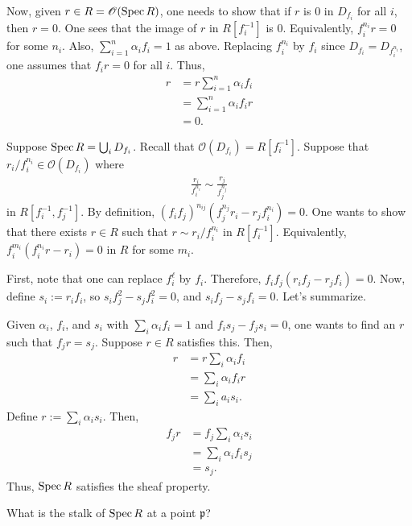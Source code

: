 \documentclass [11 pt, oneside, margin = 1 in] {article}
\begin{document}
Now, given $r\in R = \mathscr{O}(\operatorname{Spec} R)$, one needs to show that if $r$ is $0$ in $D_{f_i}$ for all $i$, then $r=0$. One sees that the image of $r$ in $R[f_i^{-1}]$ is $0$. Equivalently, $f_i^{n_i} r = 0$ for some $n_i$. Also, $\sum_{i=1}^{n} \alpha_if_i=1$ as above. Replacing $f_i^{n_i}$ by $f_i$ since $D_{f_i}=D_{f_i^{n_i}}$, one assumes that $f_ir = 0$ for all $i$. Thus,
\begin{align*}
	r &= r \sum_{i=1}^{n} \alpha_if_i\\
	  &= \sum_{i=1}^{n} \alpha_i f_ir\\
	  &= 0.
\end{align*}

Suppose $\operatorname{Spec} R = \bigcup_i D_{f_i}$.
Recall that $\mathscr{O}(D_{f_i})=R[f_i^{-1}]$. Suppose that $r_i/f_i^{n_i}\in \mathscr{O}(D_{f_i})$ where
\begin{align*}
	\frac{r_i}{f_i^{n_i}} \sim \frac{r_j}{f_j^{n_j}}
\end{align*}
in $R[f_i^{-1},f_j^{-1}]$. By definition, $(f_if_j)^{n_{ij}}(f_j^{n_j}r_i - r_j f_i^{n_i})=0$. One wants to show that there exists $r\in R$ such that $r\sim r_i/f_i^{n_i}$ in $R[f_i^{-1}]$. Equivalently, $f_i^{m_i}(f_i^{n_i} r - r_i)=0$ in $R$ for some $m_i$.

First, note that one can replace $f_i^{\ell}$ by $f_i$. Therefore, $f_if_j(r_if_j - r_jf_i)=0$. Now, define $s_i := r_if_i$, so $s_i f_j^2 - s_jf_i^2=0$, and $s_if_j - s_j f_i =0$. Let's summarize.

Given $\alpha_i$, $f_i$, and $s_i$ with $\sum_{i}^{} \alpha_if_i=1$ and $f_is_j - f_js_i=0$, one wants to find an $r$ such that $f_jr = s_j$. Suppose $r\in R$ satisfies this. Then,
\begin{align*}
	r &= r \sum_{i}^{} \alpha_if_i\\
	  &= \sum_{i}^{} \alpha_i f_ir\\
	  &= \sum_{i}^{} a_is_i.
\end{align*}
Define $r:= \sum_{i}^{} \alpha_is_i$. Then,
\begin{align*}
	f_j r &= f_j \sum_{i}^{} \alpha_is_i\\
	      &= \sum_{i}^{} \alpha_i f_i s_j\\
	      &= s_j.
\end{align*}
Thus, $\operatorname{Spec} R$ satisfies the sheaf property.

\begin{problem}
	What is the stalk of $\operatorname{Spec} R$ at a point $\mathfrak{p}$?
\end{problem}
\end{document}
